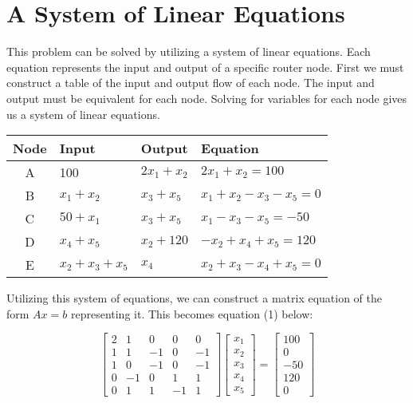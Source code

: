 \documentclass[paper.tex]{subfiles}
\begin{document}
\section{A System of Linear Equations}

This problem can be solved by utilizing a system of linear equations.
Each equation represents the input and output of a specific router node.
First we must construct a table of the input and output flow of each node.
The input and output must be equivalent for each node.
Solving for variables for each node gives us a system of linear equations.

\begin{center}
\begin{tabular}{c | l | l | l}

    \textbf{Node} & \textbf{Input} & \textbf{Output} & \textbf{Equation} \\ \hline

    A & 100                         & $2x_1 + x_2$ \hspace{8mm} & $2x_1 + x_2 = 100$             \\
    B & $x_1 + x_2$                 & $x_3 + x_5$  & $x_1 + x_2 - x_3 - x_5 = 0$    \\
    C & $50 + x_1$                  & $x_3 + x_5$  & $x_1 - x_3 - x_5 = -50$        \\
    D & $x_4 + x_5$                 & $x_2 + 120$  & $-x_2 + x_4 + x_5 = 120$       \\
    E & $x_2 + x_3 + x_5$ \hspace{8mm} & $x_4$        & $x_2 + x_3 - x_4 + x_5 = 0$                         
    
\end{tabular}
\end{center}

Utilizing this system of equations, we can construct a matrix equation of the form $Ax = b$ representing it.
This becomes equation (1) below:

\begin{center}
\begin{equation}
    \begin{bmatrix}
        2 & 1 & 0 & 0 & 0   \\
        1 & 1 & -1 & 0 & -1 \\
        1 & 0 & -1 & 0 & -1 \\
        0 & -1 & 0 & 1 & 1  \\
        0 & 1 & 1 & -1 & 1 
    \end{bmatrix}
    \begin{bmatrix}
        x_1 \\
        x_2 \\
        x_3 \\
        x_4 \\
        x_5
    \end{bmatrix}
    =
    \begin{bmatrix}
        100 \\
        0 \\
        -50 \\
        120 \\
        0
    \end{bmatrix}
\end{equation}
\end{center}
\end{document}
